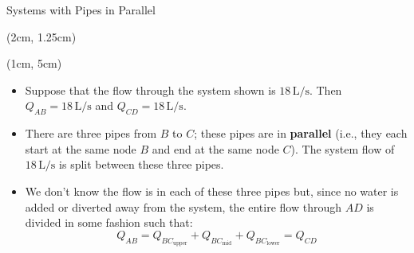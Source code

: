 \documentclass[9pt,xcolor={svgnames, x11names},mathpazo, professionalfonts]{beamer}
\begin{document}
\begin{frame}
	
	\parb
	
\end{frame}

\begin{frame}
	
	\parb
	
\end{frame}

%
\begin{frame}{Systems with Pipes in Parallel}
	
	\begin{textblock*}{0.75\columnwidth}(2cm, 1.25cm)
	\end{textblock*}
	
	\begin{textblock*}{1\columnwidth}(1cm, 5cm)
		\begin{itemize}
			\item Suppose that the flow through the system shown is $18\,\text{L/s}$. Then $Q_{AB}=18\,\text{L/s}$ and $Q_{CD}=18\,\text{L/s}$.\par
			\item There are three pipes from $B$ to $C$; these pipes are in {\bfseries parallel} (i.e., they each start at the same node $B$ and end at the same node $C$). The system flow of $18\,\text{L/s}$ is split between these three pipes. \par
			\item 	We don't know the flow is in each of these three pipes but, since no water is added or diverted away from the system, the entire flow through $AD$ is divided in some fashion such that:
			      \vspace{-0.25cm}
			      \[ Q_{AB} = Q_{BC_\text{upper}} +  Q_{BC_\text{mid}}+ Q_{BC_\text{lower}} = Q_{CD} \]
		\end{itemize}
		
	\end{textblock*}
\end{frame}
\end{document}
